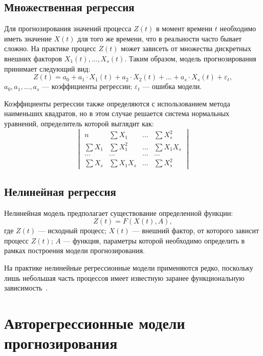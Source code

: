 \subsection{Множественная регрессия}
Для прогнозирования значений процесса $Z(t)$ в момент времени $t$ необходимо иметь значение $X(t)$ для того же времени, что в реальности часто бывает сложно.
На практике процесс $Z(t)$ может зависеть от множества дискретных внешних факторов $X_1(t),\ldots,X_s(t)$.
Таким образом, модель прогнозирования принимает следующий вид:
\begin{equation}
    Z(t) = a_0 + a_1 \cdot X_1(t) + a_2 \cdot X_2(t) + \ldots + a_s \cdot X_s(t) + \varepsilon_t,
\end{equation}
$a_0, a_1, \ldots, a_s$ --- коэффициенты регрессии; $\varepsilon_t$ --- ошибка модели.

Коэффициенты регрессии также определяются с использованием метода наименьших квадратов, но в этом случае решается система нормальных уравнений, определитель которой выглядит как:
\begin{equation}
    \begin{vmatrix}
        n & \sum X_1 & \ldots & \sum X_s^2 \\
        \sum X_1 & \sum X_1^2 & \ldots & \sum X_1X_s \\
        \ldots & \ldots & \ldots & \ldots \\
        \sum X_s & \sum X_1X_s & \ldots & \sum X_s^2
    \end{vmatrix}
\end{equation}

\subsection{Нелинейная регрессия}

Нелинейная модель предполагает существование определенной функции:
\begin{equation}
    Z(t) = F(X(t), A),
\end{equation}
где $Z(t)$ --- исходный процесс;
$X(t)$ --- внешний фактор, от которого зависит процесс $Z(t)$;
$A$ --- функция, параметры которой необходимо определить в рамках построения модели прогнозирования.

На практике нелинейные регрессионные модели применяются редко, поскольку лишь небольшая часть процессов имеет известную заранее функциональную зависимость~\cite{aliref3}.

\section{Авторегрессионные модели прогнозирования}

